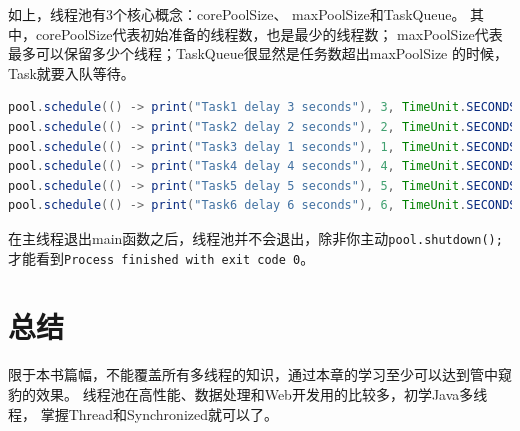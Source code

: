\noindent
如上，线程池有3个核心概念：corePoolSize、
maxPoolSize和TaskQueue。
其中，corePoolSize代表初始准备的线程数，也是最少的线程数；
maxPoolSize代表最多可以保留多少个线程；TaskQueue很显然是任务数超出maxPoolSize
的时候，Task就要入队等待。

\begin{lstlisting}[language=Java]
pool.schedule(() -> print("Task1 delay 3 seconds"), 3, TimeUnit.SECONDS);
pool.schedule(() -> print("Task2 delay 2 seconds"), 2, TimeUnit.SECONDS);
pool.schedule(() -> print("Task3 delay 1 seconds"), 1, TimeUnit.SECONDS);
pool.schedule(() -> print("Task4 delay 4 seconds"), 4, TimeUnit.SECONDS);
pool.schedule(() -> print("Task5 delay 5 seconds"), 5, TimeUnit.SECONDS);
pool.schedule(() -> print("Task6 delay 6 seconds"), 6, TimeUnit.SECONDS);
\end{lstlisting}

\noindent
在主线程退出main函数之后，线程池并不会退出，除非你主动\lstinline{pool.shutdown();}
才能看到\lstinline{Process finished with exit code 0}。

\section{总结}
限于本书篇幅，不能覆盖所有多线程的知识，通过本章的学习至少可以达到管中窥豹的效果。
线程池在高性能、数据处理和Web开发用的比较多，初学Java多线程，
掌握Thread和Synchronized就可以了。